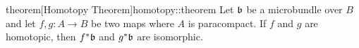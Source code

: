 \begin{mystatement}{theorem}[Homotopy Theorem]{homotopy::theorem}
    Let $\bb$ be a microbundle over $B$ and let $f, g: A \to B$ be two maps where $A$ is paracompact.
    If $f$ and $g$ are homotopic, then $\ind{f}\bb$ and $\ind{g}\bb$ are isomorphic.
\end{mystatement}